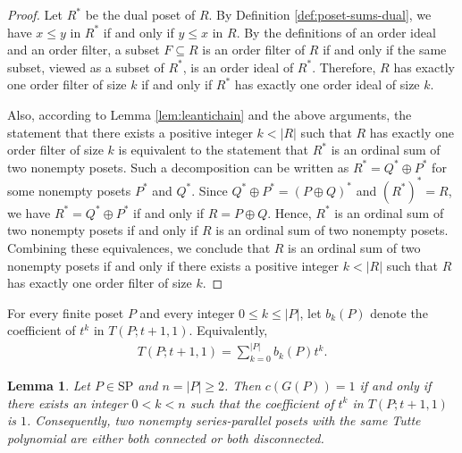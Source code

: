 \documentclass[10pt,a4paper]{amsart}
\newtheorem{lemma}[theorem]{Lemma}
\begin{document}
\begin{proof}
Let $R^*$ be the dual poset of $R$. By Definition \ref{def:poset-sums-dual}, 
we have $x\le y$ in $R^*$ if and only if $y\le x$ in $R$.
By the definitions of an order ideal and an order filter,
a subset $F\subseteq R$ is an order filter of $R$
if and only if the same subset, viewed as a subset of $R^*$,
is an order ideal of $R^*$.
Therefore, $R$ has exactly one order filter of size $k$
if and only if $R^*$ has exactly one order ideal of size $k$.

Also, according to Lemma \ref{lem:leantichain} and the above arguments, 
the statement that there exists a positive integer $k<|R|$ such that 
$R$ has exactly one order filter of size $k$ is equivalent to 
the statement that $R^*$ is an ordinal sum of two nonempty posets.
Such a decomposition can be written as $R^*=Q^*\oplus P^*$ 
for some nonempty posets $P^*$ and $Q^*$.
Since $Q^*\oplus P^*=(P\oplus Q)^*$ and $(R^*)^*=R$,
we have $R^*=Q^*\oplus P^*$ if and only if $R=P\oplus Q$.
Hence, $R^*$ is an ordinal sum of two nonempty posets
if and only if $R$ is an ordinal sum of two nonempty posets.
Combining these equivalences, we conclude that $R$ is an ordinal sum
of two nonempty posets if and only if there exists a positive integer
$k<|R|$ such that $R$ has exactly one order filter of size $k$.
\end{proof}

For every finite poset $P$ and every integer
$0\leq k\leq |P|$, let $b_k(P)$ denote the coefficient of
$t^k$ in $T(P;t+1,1)$. Equivalently,
\begin{eqnarray*}
T(P;t+1,1)=\sum_{k=0}^{|P|}b_k(P)t^k.
\end{eqnarray*}

\begin{lemma}\label{lem:connectivity}
Let $P\in\mathrm{SP}$ and $n=|P|\geq 2$.
Then $c(G(P))=1$ if and only if there exists an integer
$0<k<n$ such that the coefficient of $t^k$ in $T(P;t+1,1)$
is $1$.
Consequently, two nonempty series-parallel posets with the same
Tutte polynomial are either both connected or both disconnected.
\end{lemma}
\end{document}
